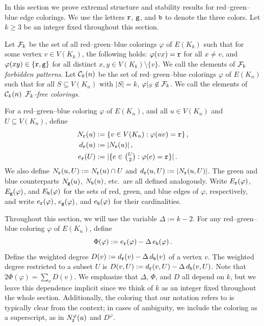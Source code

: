 In this section we prove extremal structure and stability results for red--green--blue edge colorings. We use the letters ${\normalfont\texttt r}$, ${\normalfont\texttt g}$, and ${\normalfont\texttt b}$ to denote the three colors. Let $k\geq3$ be an integer fixed throughout this section.

\begin{definition}\label{dfn:Fk-free-cols}
Let ${\mathcal F}_k$ be the set of all red--green--blue colorings $\varphi$ of $E(K_k)$ such that for some vertex $v\in V(K_k)$, the following holds: $\varphi(vx)={\normalfont\texttt r}$ for all $x\neq v$, and $\varphi(xy)\in\{{\normalfont\texttt r},{\normalfont\texttt g}\}$ for all distinct $x,y\in V(K_k)\setminus\{v\}$. We call the elements of ${\mathcal F}_k$ \emph{forbidden patterns}. Let ${\mathcal C}_k(n)$ be the set of red--green--blue colorings $\varphi$ of $E(K_n)$ such that for all $S\subseteq V(K_n)$ with $|S|=k$, $\varphi|_S\not\in{\mathcal F}_k$. We call the elements of ${\mathcal C}_k(n)$ \emph{${\mathcal F}_k$-free colorings}.
\end{definition}

For a red--green--blue coloring $\varphi$ of $E(K_n)$, and all $u\in V(K_n)$ and $U\subseteq V(K_n)$, define 
\begin{align*}
N_{\normalfont\texttt r}(u) &:= \{v\in V(K_n):\varphi(uv)={\normalfont\texttt r}\}\,, \\
d_{\normalfont\texttt r}(u) &:= |N_{\normalfont\texttt r}(u)|\,, \\
e_{\normalfont\texttt r}(U) &:= |\{e\in\textstyle\binom{U}{2}:\varphi(e)={\normalfont\texttt r}\}|\,.
\end{align*}
We also define $N_{\normalfont\texttt r}(u,U):=N_{\normalfont\texttt r}(u)\cap U$ and $d_{\normalfont\texttt r}(u,U):=|N_{\normalfont\texttt r}(u,U)|$. The green and blue counterparts $N_{\normalfont\texttt g}(u)$, $N_{\normalfont\texttt b}(u)$, etc.\ are all defined analogously. Write $E_{\normalfont\texttt r}(\varphi)$, $E_{\normalfont\texttt g}(\varphi)$, and $E_{\normalfont\texttt b}(\varphi)$ for the sets of red, green, and blue edges of $\varphi$, respectively, and write $e_{\normalfont\texttt r}(\varphi)$, $e_{\normalfont\texttt g}(\varphi)$, and $e_{\normalfont\texttt b}(\varphi)$ for their cardinalities.

Throughout this section, we will use the variable $\Delta:=k-2$. For any red--green--blue coloring $\varphi$ of $E(K_n)$, define
$$\Phi(\varphi):=e_{\normalfont\texttt r}(\varphi)-\Delta\,e_{\normalfont\texttt b}(\varphi)\,.$$
Define the weighted degree $D(v):=d_{\normalfont\texttt r}(v)-\Delta\,d_{\normalfont\texttt b}(v)$ of a vertex $v$. The weighted degree restricted to a subset $U$ is $D(v,U):=d_{\normalfont\texttt r}(v,U)-\Delta\,d_{\normalfont\texttt b}(v,U)$. Note that $2\Phi(\varphi)=\sum_vD(v)$. We emphasize that $\Delta$, $\Phi$, and $D$ all depend on $k$, but we leave this dependence implicit since we think of $k$ as an integer fixed throughout the whole section. Additionally, the coloring that our notation refers to is typically clear from the context; in cases of ambiguity, we include the coloring as a superscript, as in $N_{\normalfont\texttt r}^\varphi(u)$ and $D^\varphi$.

